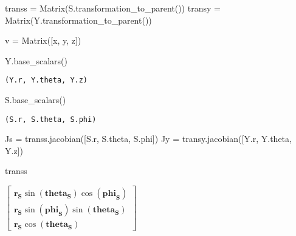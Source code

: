 \documentclass[
  a4paper,
  DIV=11,
  numbers=noendperiod]{scrreprt}
\newenvironment{Shaded}{\begin{snugshade}}{\end{snugshade}}
\newcommand{\NormalTok}[1]{\textcolor[rgb]{0.00,0.23,0.31}{#1}}
\newcommand{\OperatorTok}[1]{\textcolor[rgb]{0.37,0.37,0.37}{#1}}
\begin{document}
\begin{Shaded}
\begin{Highlighting}[]
\NormalTok{transs }\OperatorTok{=}\NormalTok{ Matrix(S.transformation\_to\_parent())}
\NormalTok{transy }\OperatorTok{=}\NormalTok{ Matrix(Y.transformation\_to\_parent())}
\end{Highlighting}
\end{Shaded}

\begin{Shaded}
\begin{Highlighting}[]
\NormalTok{v }\OperatorTok{=}\NormalTok{ Matrix([x, y, z])}
\end{Highlighting}
\end{Shaded}

\begin{Shaded}
\begin{Highlighting}[]
\NormalTok{Y.base\_scalars()}
\end{Highlighting}
\end{Shaded}

\begin{verbatim}
(Y.r, Y.theta, Y.z)
\end{verbatim}

\begin{Shaded}
\begin{Highlighting}[]
\NormalTok{S.base\_scalars()}
\end{Highlighting}
\end{Shaded}

\begin{verbatim}
(S.r, S.theta, S.phi)
\end{verbatim}

\begin{Shaded}
\begin{Highlighting}[]
\NormalTok{Js }\OperatorTok{=}\NormalTok{ transs.jacobian([S.r, S.theta, S.phi])}
\NormalTok{Jy }\OperatorTok{=}\NormalTok{ transy.jacobian([Y.r, Y.theta, Y.z])}
\end{Highlighting}
\end{Shaded}

\begin{Shaded}
\begin{Highlighting}[]
\NormalTok{transs}
\end{Highlighting}
\end{Shaded}

$\displaystyle \left[\begin{matrix}\mathbf{{r}_{S}} \sin{\left(\mathbf{{theta}_{S}} \right)} \cos{\left(\mathbf{{phi}_{S}} \right)}\\\mathbf{{r}_{S}} \sin{\left(\mathbf{{phi}_{S}} \right)} \sin{\left(\mathbf{{theta}_{S}} \right)}\\\mathbf{{r}_{S}} \cos{\left(\mathbf{{theta}_{S}} \right)}\end{matrix}\right]$
\end{document}
